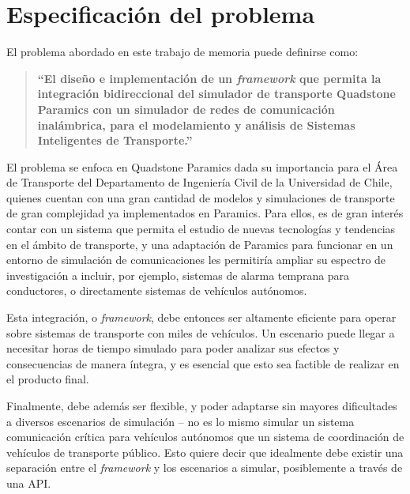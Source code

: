 \section{Especificación del problema}

El problema abordado en este trabajo de memoria puede definirse como: 
\begin{quote}
    \textbf{``El diseño e implementación de un \emph{framework} que permita la integración bidireccional del simulador de transporte Quadstone Paramics con un simulador de redes de comunicación inalámbrica, para el modelamiento y análisis de Sistemas Inteligentes de Transporte.''}
\end{quote}

El problema se enfoca en Quadstone Paramics dada su importancia para el Área de Transporte del Departamento de Ingeniería Civil de la Universidad de Chile, quienes cuentan con una gran cantidad de modelos y simulaciones de transporte de gran complejidad ya implementados en Paramics.
Para ellos, es de gran interés contar con un sistema que permita el estudio de nuevas tecnologías y tendencias en el ámbito de transporte, y una adaptación de Paramics para funcionar en un entorno de simulación de comunicaciones les permitiría ampliar su espectro de investigación a incluir, por ejemplo, sistemas de alarma temprana para conductores, o directamente sistemas de vehículos autónomos.

Esta integración, o \emph{framework}, debe entonces ser altamente eficiente para operar sobre sistemas de transporte con miles de vehículos. Un escenario puede llegar a necesitar horas de tiempo simulado para poder analizar sus efectos y consecuencias de manera íntegra, y es esencial que esto sea factible de realizar en el producto final.

Finalmente, debe además ser flexible, y poder adaptarse sin mayores dificultades a diversos escenarios de simulación -- no es lo mismo simular un sistema comunicación crítica para vehículos autónomos que un sistema de coordinación de vehículos de transporte público. Esto quiere decir que idealmente debe existir una separación entre el \emph{framework} y los escenarios a simular, posiblemente a través de una API.